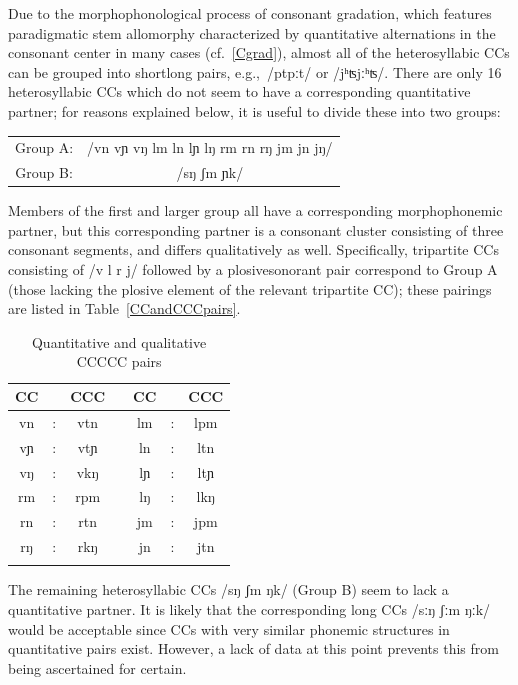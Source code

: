 Due to the morphophonological process of consonant gradation, which features paradigmatic stem allomorphy characterized by quantitative alternations in the consonant center in many cases (cf.~\SEC\ref{Cgrad}), 
almost all of the heterosyllabic CCs can be grouped into short\TILDE long pairs, e.g.,~/pt\TILDE pːt/ or /jʰʦ\TILDE jːʰʦ/. There are only 16 heterosyllabic CCs which do not seem to have a corresponding quantitative partner; for reasons explained below, it is useful to divide these into two groups: %
\begin{center}
\begin{tabular}{c c}
Group A: & /vn vɲ vŋ lm ln lɲ lŋ rm rn rŋ jm jn jŋ/\\
Group B: & /sŋ ʃm ɲk/ \\
\end{tabular}
\end{center}
Members of the first and larger group all have a corresponding morphophonemic partner, but this corresponding partner is a consonant cluster consisting of three consonant segments, and differs qualitatively as well. Specifically, tripartite CCs consisting of /v l r j/ followed by a plosive\PLUS sonorant pair %
correspond to Group A (those lacking the plosive element of the relevant tripartite CC); these pairings are listed in Table~\vref{CCandCCCpairs}. 
\begin{table}[ht]\centering
\caption{Quantitative and qualitative CC\TILDE CCC pairs}\label{CCandCCCpairs}
\begin{tabular}{ccc p{30pt} ccc}\mytoprule
CC	&\TILDE & CCC	&&	CC	&\TILDE & CCC\\\hline%
vn	&:& vtn 	&&	lm	&:& lpm \\
vɲ	&:& vtɲ 	&&	ln	&:& ltn \\
vŋ	&:& vkŋ	&&	lɲ	&:& ltɲ \\
rm	&:& rpm	&&	lŋ	&:& lkŋ \\
rn	&:& rtn	&&	jm	&:& jpm \\
rŋ	&:& rkŋ 	&&	jn	&:& jtn \\\mybottomrule%
\end{tabular}
\end{table}

The remaining heterosyllabic CCs /sŋ ʃm ŋk/ (Group B) seem to lack a quantitative partner. It is likely that the corresponding long CCs /sːŋ ʃːm ŋːk/ would be acceptable since CCs with very similar phonemic structures in quantitative pairs exist. However, a lack of data at this point prevents this from being ascertained for certain.

